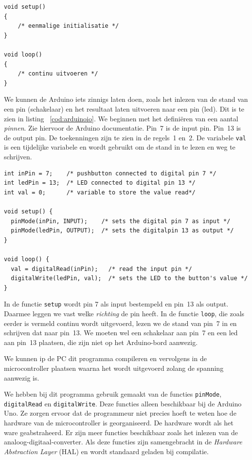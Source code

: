 \begin{lstlisting}[caption=Uitvoering op een Adruino Uno.,label=cod:uno]
void setup()
{
    /* eenmalige initialisatie */
}

void loop()
{
    /* continu uitvoeren */
}
\end{lstlisting}

We kunnen de Arduino iets zinnigs laten doen, zoals het inlezen van de stand van een pin (schakelaar) en het resultaat laten uitvoeren naar een pin (led). Dit is te zien in listing~ \ref{cod:arduinoio}. We beginnen met het defini\"eren van een aantal \textsl{pinnen}. Zie hiervoor de Arduino documentatie. Pin~7 is de input pin. Pin~13 is de output pin. De toekenningen zijn te zien in de regels~1 en~2. De variabele \lstinline|val| is een tijdelijke variabele en wordt gebruikt om de stand in te lezen en weg te schrijven.

\begin{lstlisting}[caption={Inlezen van een pin en het resultaat schrijven naar een pin.},label=cod:arduinoio]
int inPin = 7;    /* pushbutton connected to digital pin 7 */
int ledPin = 13;  /* LED connected to digital pin 13 */
int val = 0;      /* variable to store the value read*/

void setup() {
  pinMode(inPin, INPUT);    /* sets the digital pin 7 as input */
  pinMode(ledPin, OUTPUT);  /* sets the digitalpin 13 as output */
}

void loop() {
  val = digitalRead(inPin);   /* read the input pin */
  digitalWrite(ledPin, val);  /* sets the LED to the button's value */
}
\end{lstlisting}

In de functie \lstinline|setup| wordt pin 7 als input bestempeld en pin~13 als output. Daarmee leggen we vast welke \textsl{richting} de pin heeft. In de functie \lstinline|loop|, die zoals eerder is vermeld continu wordt uitgevoerd, lezen we de stand van pin~7 in en schrijven dat naar pin~13. We moeten wel een schakelaar aan pin~7 en een led aan pin~13 plaatsen, die zijn niet op het Arduino-bord aanwezig.

We kunnen ip  de PC dit programma compileren en vervolgens in de microcontroller plaatsen waarna het wordt uitgevoerd zolang de spanning aanwezig is.

We hebben bij dit programma gebruik gemaakt van de functies \lstinline|pinMode|, \lstinline|digitalRead| en \lstinline|digitalWrite|. Deze functies alleen beschikbaar bij de Arduino Uno. Ze zorgen ervoor dat de programmeur niet precies hoeft te weten hoe de hardware van de microcontroller is georganiseerd. De hardware wordt als het ware geabstraheerd. Er zijn meer functies beschikbaar zoals het inlezen van de analoog-digitaal-converter. Als deze functies zijn samengebracht in de \textsl{Hardware Abstraction Layer} (HAL) en wordt standaard geladen bij compilatie.

